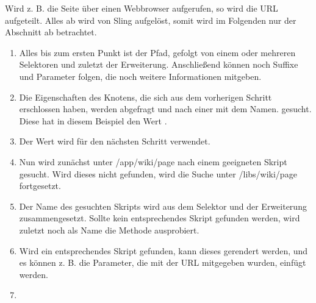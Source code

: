 Wird z. B. die Seite über einen Webbrowser  aufgerufen, so wird die URL aufgeteilt. Alles ab  wird von Sling aufgelöst, somit wird im Folgenden nur der Abschnitt ab  betrachtet.
\begin{enumerate}
	\item Alles bis zum ersten Punkt ist der Pfad, gefolgt von einem oder mehreren Selektoren und zuletzt der Erweiterung. Anschließend können noch Suffixe und Parameter folgen, die noch weitere Informationen mitgeben.
	\item Die Eigenschaften des Knotens, die sich aus dem vorherigen Schritt erschlossen haben, werden abgefragt und nach einer mit dem Namen.  gesucht. Diese hat in diesem Beispiel den Wert .
	\item Der Wert wird für den nächsten Schritt verwendet.
	\item Nun wird zunächst unter /app/wiki/page nach einem geeigneten Skript gesucht. Wird dieses nicht gefunden, wird die Suche unter /libs/wiki/page fortgesetzt.
	\item Der Name des gesuchten Skripts wird aus dem Selektor und der Erweiterung zusammengesetzt. Sollte kein entsprechendes Skript gefunden werden, wird zuletzt noch als Name die Methode ausprobiert.
	\item Wird ein entsprechendes Skript gefunden, kann dieses gerendert werden, und es können z. B. die Parameter, die mit der URL mitgegeben wurden, einfügt werden.
	\item {}
\end{enumerate}